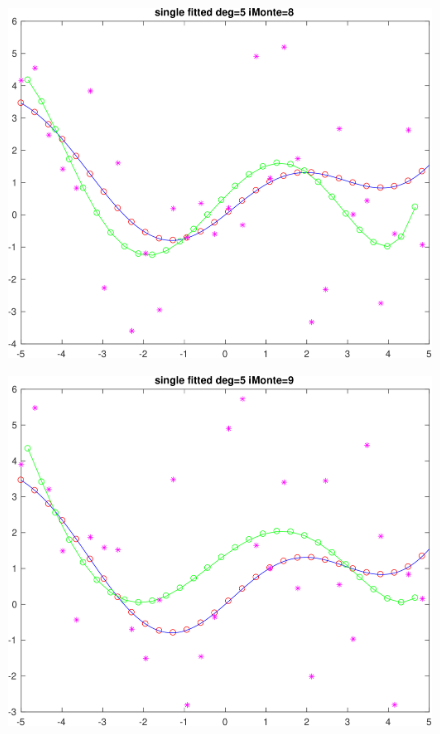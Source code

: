 \begin{figure}[h!]
\centering\includegraphics[scale=0.1]{single_poly_d_5_iMonte_8.png}
\end{figure}


\begin{figure}[h!]
\centering\includegraphics[scale=0.1]{single_poly_d_5_iMonte_9.png}
\end{figure}


